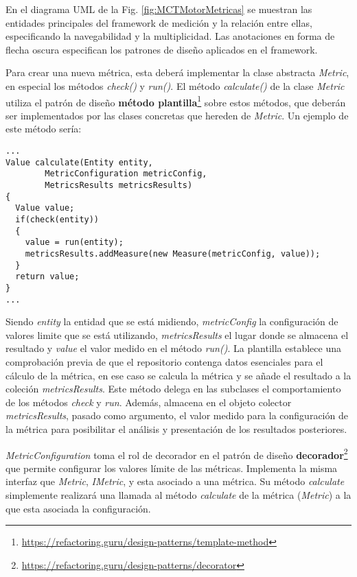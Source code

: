 
En el diagrama UML de la Fig. \ref{fig:MCTMotorMetricas} se muestran las entidades principales del framework de medición y la relación entre ellas, especificando la navegabilidad y la multiplicidad. Las anotaciones en forma de flecha oscura especifican los patrones de diseño \cite{gamma_patrones_2002} aplicados en el framework.

Para crear una nueva métrica, esta deberá implementar la clase abstracta \textit{Metric}, en especial los métodos \textit{check()} y \textit{run()}. El método \textit{calculate()} de la clase \textit{Metric} utiliza el patrón de diseño \textbf{método plantilla}\footnote{\url{https://refactoring.guru/design-patterns/template-method}} sobre estos métodos, que deberán ser implementados por las clases concretas que hereden de \textit{Metric}. Un ejemplo de este método sería:

\begin{minipage}{\linewidth}
\begin{verbatim}
...
Value calculate(Entity entity, 
		MetricConfiguration metricConfig, 
		MetricsResults metricsResults) 
{
  Value value;
  if(check(entity))
  {
    value = run(entity);
    metricsResults.addMeasure(new Measure(metricConfig, value));
  }
  return value;
}
...
\end{verbatim}
\end{minipage}

Siendo \textit{entity} la entidad que se está midiendo, \textit{metricConfig} la configuración de valores limite que se está utilizando, \textit{metricsResults} el lugar donde se almacena el resultado y \textit{value} el valor medido en el método \textit{run()}. La plantilla establece una comprobación previa de que el repositorio contenga datos esenciales para el cálculo de la métrica, en ese caso se calcula la métrica y se añade el resultado a la coleción \textit{metricsResults}. 
Este método delega en las subclases el comportamiento de los métodos \textit{check} y \textit{run}. Además, almacena en el objeto colector \textit{metricsResults}, pasado como argumento, el valor medido para la configuración de la métrica para posibilitar el análisis y presentación de los resultados posteriores.

\textit{MetricConfiguration} toma el rol de decorador en el patrón de diseño \textbf{decorador}\footnote{\url{https://refactoring.guru/design-patterns/decorator}} que permite configurar los valores límite de las métricas. Implementa la misma interfaz que \textit{Metric}, \textit{IMetric}, y esta asociado a una métrica. Su método \textit{calculate} simplemente realizará una llamada al método \textit{calculate} de la métrica (\textit{Metric}) a la que esta asociada la configuración.

